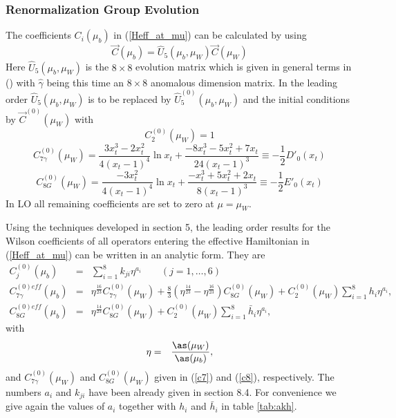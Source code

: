 \subsubsection{Renormalization Group Evolution}
         \label{sec:Heff:BXsgamma:RGE}
The coefficients $C_i(\mu_b)$ in (\ref{Heff_at_mu}) can be calculated
by using
\begin{equation}
\vec C(\mu_b)= \hat U_5(\mu_b,\mu_W)\vec C(\mu_W)
\end{equation}
Here $ \hat U_5(\mu_b,\mu_W)$ is the $8\times 8$ evolution matrix which is
given in general terms in () with $\hat\gamma$ being this
time an $8\times 8$ anomalous dimension matrix. In the leading order
$\hat U_5(\mu_b,\mu_W)$ is to be replaced by $\hat U_5^{(0)}(\mu_b,\mu_W)$ 
and
the initial conditions by $\vec C^{(0)}(\mu_W)$ with \cite{Grin}
\begin{equation}\label{c2}
C^{(0)}_2(\mu_W) = 1                               
\end{equation}
\begin{equation}\label{c7}
C^{(0)}_{7\gamma} (\mu_W) = \frac{3 x_t^3-2 x_t^2}{4(x_t-1)^4}\ln x_t + 
   \frac{-8 x_t^3 - 5 x_t^2 + 7 x_t}{24(x_t-1)^3}
   \equiv -\frac{1}{2} D'_0(x_t)
\end{equation}
\begin{equation}\label{c8}
C^{(0)}_{8G}(\mu_W) = \frac{-3 x_t^2}{4(x_t-1)^4}\ln x_t +
   \frac{-x_t^3 + 5 x_t^2 + 2 x_t}{8(x_t-1)^3}                               
   \equiv -\frac{1}{2} E'_0(x_t)
\end{equation}
In LO
all remaining coefficients are set to zero at $\mu=\mu_W$. 

Using the techniques developed in section 5, the leading order results for 
the Wilson coefficients of all operators
entering the effective Hamiltonian in (\ref{Heff_at_mu}) can be written
in an analytic form. They are \cite{BMMP:94}
\begin{eqnarray}
\label{coeffs}
C_j^{(0)}(\mu_b)    & = & \sum_{i=1}^8 k_{ji} \eta^{a_i}
  \qquad (j=1,\ldots,6)  \\
\label{C7eff}
C_{7\gamma}^{(0)eff}(\mu_b) & = & 
\eta^\frac{16}{23} C_{7\gamma}^{(0)}(\mu_W) + \frac{8}{3}
\left(\eta^\frac{14}{23} - \eta^\frac{16}{23}\right) C_{8G}^{(0)}(\mu_W) +
 C_2^{(0)}(\mu_W)\sum_{i=1}^8 h_i \eta^{a_i},
\\
\label{C7Geff}
C_{8G}^{(0)eff}(\mu_b) & = & 
\eta^\frac{14}{23} C_{8G}^{(0)}(\mu_W) 
   + C_2^{(0)}(\mu_W) \sum_{i=1}^8 \bar h_i \eta^{a_i},
\end{eqnarray}
with
\begin{eqnarray}
\eta & = & \frac{\as(\mu_W)}{\as(\mu_b)}, 
\end{eqnarray}
and $C_{7\gamma}^{(0)}(\mu_W)$
and $ C_{8G}^{(0)}(\mu_W)$ given in (\ref{c7}) and (\ref{c8}),
respectively. The numbers $a_i$ and $k_{ji}$ have been already given
in section 8.4. For convenience we give again the values 
of $a_i$ together with $h_i$ and $\bar h_i$ 
in table \ref{tab:akh}.


